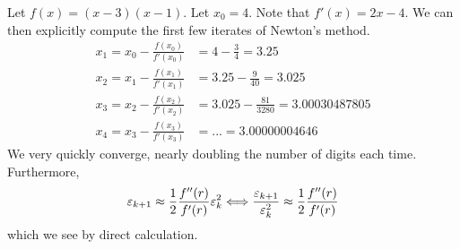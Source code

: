 \documentclass[11pt]{article}
\begin{document}
\begin{example}{}{}
    Let $f(x) = (x-3)(x-1)$. Let $x_0 = 4$. Note that $f'(x) = 2x-4$. We can then explicitly compute the first few iterates of Newton's method. 
    \begin{align*}
        x_1 = x_0 - \frac{f(x_0)}{f'(x_0)} &= 4- \frac{3}{4} = 3.25\\
        x_2 = x_1 - \frac{f(x_1)}{f'(x_1)} &= 3.25-\frac{9}{40}= 3.025\\
         x_3 = x_2 - \frac{f(x_2)}{f'(x_2)} &= 3.025-\frac{81}{3280}= 3.00030487805\\
         x_4 = x_3 - \frac{f(x_3)}{f'(x_3)} &= ... = 3.00000004646
    \end{align*}
    We very quickly converge, nearly doubling the number of digits each time. Furthermore, $$\varepsilon_{k+1} \approx \frac{1}{2}\frac{f''(r)}{f'(r)}\varepsilon_k^2 \Longleftrightarrow \frac{\varepsilon_{k+1}}{\varepsilon_k^2} \approx \frac{1}{2}\frac{f''(r)}{f'(r)}$$ which we see by direct calculation. 
\end{example}
\end{document}
